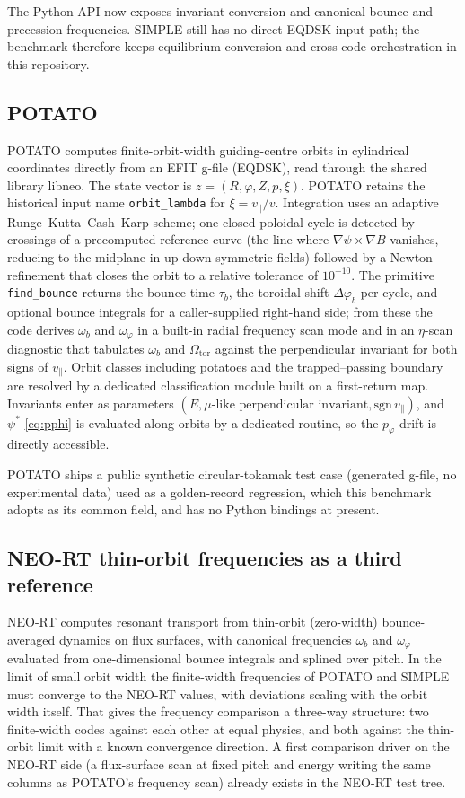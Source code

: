 \documentclass[11pt,a4paper]{article}
\newcommand{\code}[1]{\texttt{#1}}
\begin{document}
The Python API now exposes invariant conversion and canonical bounce and
precession frequencies. SIMPLE still has no direct EQDSK input path; the
benchmark therefore keeps equilibrium conversion and cross-code orchestration
in this repository.

\subsection{POTATO}

POTATO computes finite-orbit-width guiding-centre orbits in cylindrical
coordinates directly from an EFIT g-file (EQDSK), read through the shared
library libneo. The state vector is $z=(R,\varphi,Z,p,\xi)$. POTATO retains
the historical input name \code{orbit\_lambda} for $\xi=v_\parallel/v$.
Integration
uses an adaptive Runge--Kutta--Cash--Karp scheme; one closed poloidal cycle is
detected by crossings of a precomputed reference curve (the line where
$\nabla\psi\times\nabla B$ vanishes, reducing to the midplane in up-down
symmetric fields) followed by a Newton refinement that closes the orbit to a
relative tolerance of $10^{-10}$. The primitive \code{find\_bounce} returns
the bounce time $\tau_b$, the toroidal shift $\Delta\varphi_b$ per cycle, and
optional bounce integrals for a caller-supplied right-hand side; from these
the code derives $\omega_b$ and $\omega_\varphi$ in a built-in radial
frequency scan mode and in an $\eta$-scan diagnostic that tabulates
$\omega_b$ and $\Omega_{\mathrm{tor}}$ against the perpendicular invariant
for both signs of $v_\parallel$. Orbit classes including potatoes and the
trapped--passing boundary are resolved by a dedicated classification module
built on a first-return map. Invariants enter as parameters
$(E, \mu\text{-like perpendicular invariant}, \mathrm{sgn}\,v_\parallel)$,
and $\psi^*$ \eqref{eq:pphi} is evaluated along orbits by a dedicated
routine, so the $p_\varphi$ drift is directly accessible.

POTATO ships a public synthetic circular-tokamak test case (generated
g-file, no experimental data) used as a golden-record regression, which this
benchmark adopts as its common field, and has no Python bindings at present.

\subsection{NEO-RT thin-orbit frequencies as a third reference}

NEO-RT \citep{albert2016} computes resonant transport from thin-orbit
(zero-width) bounce-averaged dynamics on flux surfaces, with canonical
frequencies $\omega_b$ and $\omega_\varphi$ evaluated from one-dimensional
bounce integrals and splined over pitch. In the limit of small orbit width
the finite-width frequencies of POTATO and SIMPLE must converge to the
NEO-RT values, with deviations scaling with the orbit width itself. That
gives the frequency comparison a three-way structure: two finite-width codes
against each other at equal physics, and both against the thin-orbit limit
with a known convergence direction. A first comparison driver on the NEO-RT
side (a flux-surface scan at fixed pitch and energy writing the same columns
as POTATO's frequency scan) already exists in the NEO-RT test tree.
\end{document}
